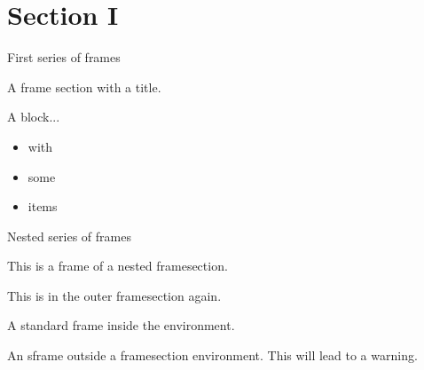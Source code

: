 \documentclass{beamer}
\begin{document}
\section*{Section I}

\begin{framesection}{First series of frames}
  \begin{sframe}
    A frame section with a title.
  \end{sframe}

  \begin{sframe}
    \begin{block}{A block...}
        \begin{itemize}
          \item with 
          \item some
          \item items
        \end{itemize}
    \end{block}
  \end{sframe}

  \begin{framesection}{Nested series of frames}
    \begin{sframe}
      This is a frame of a nested framesection.\\
      \debugframesectiontitle
    \end{sframe}
  \end{framesection}

  \begin{sframe}
    This is in the outer framesection again.\\
    \debugframesectiontitle
  \end{sframe}

  \begin{frame}
    A standard frame inside the environment.

    \debugframesectiontitle
  \end{frame}
\end{framesection}

\begin{sframe}
  An sframe outside a framesection environment.
  This will lead to a warning.\\
  \debugframesectiontitle
\end{sframe}
\end{document}
